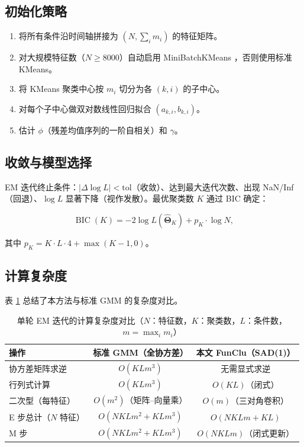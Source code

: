 \documentclass[12pt,a4paper]{article}
\begin{document}
\subsection{初始化策略}

\begin{enumerate}[leftmargin=*]
    \item 将所有条件沿时间轴拼接为 $(N, \sum_i m_i)$ 的特征矩阵。
    \item 对大规模特征数（$N \geq 8000$）自动启用 MiniBatchKMeans \cite{sculley2010web}，否则使用标准 KMeans。
    \item 将 KMeans 聚类中心按 $m_i$ 切分为各 $(k,i)$ 的子中心。
    \item 对每个子中心做双对数线性回归拟合 $(a_{k,i}, b_{k,i})$。
    \item 估计 $\phi$（残差均值序列的一阶自相关）和 $\gamma$。
\end{enumerate}

\subsection{收敛与模型选择}

EM 迭代终止条件：$|\Delta \log L| < \text{tol}$（收敛）、达到最大迭代次数、出现 NaN/Inf（回退）、$\log L$ 显著下降（视作发散）。最优聚类数 $K$ 通过 BIC \cite{schwarz1978estimating} 确定：

\begin{equation}\label{eq:bic}
    \operatorname{BIC}(K) = -2 \log L(\hat{\bm{\Theta}}_K) + p_K \cdot \log N,
\end{equation}

其中 $p_K = K \cdot L \cdot 4 + \max(K-1, 0)$。

\subsection{计算复杂度}

表 \ref{tab:complexity} 总结了本方法与标准 GMM 的复杂度对比。

\begin{table}[htbp]
    \centering
    \caption{单轮 EM 迭代的计算复杂度对比（$N$：特征数，$K$：聚类数，$L$：条件数，$m = \max_i m_i$）}
    \label{tab:complexity}
    \begin{tabular}{lcc}
        \toprule
        操作 & 标准 GMM（全协方差） & 本文 FunClu（SAD(1)）\\
        \midrule
        协方差矩阵求逆 & $O(K L m^3)$ & 无需显式求逆 \\
        行列式计算 & $O(K L m^3)$ & $O(K L)$（闭式） \\
        二次型（每特征） & $O(m^2)$（矩阵--向量乘） & $O(m)$（三对角卷积） \\
        E 步总计（$N$ 特征） & $O(N K L m^2 + K L m^3)$ & $O(N K L m + K L)$ \\
        M 步 & $O(N K L m^2 + K L m^3)$ & $O(N K L m)$（闭式更新） \\
        \bottomrule
    \end{tabular}
\end{table}
\end{document}
